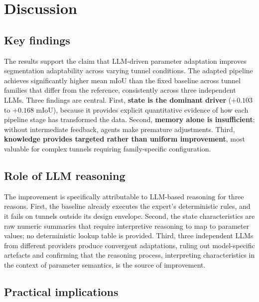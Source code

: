 \documentclass[a4paper,fleqn]{cas-dc}
\begin{document}
\section{Discussion}\label{sec:discussion}

\subsection{Key findings}

The results support the claim that LLM-driven parameter adaptation improves segmentation adaptability across varying tunnel conditions. The adapted pipeline achieves significantly higher mean mIoU than the fixed baseline across tunnel families that differ from the reference, consistently across three independent LLMs. Three findings are central. First, \textbf{state is the dominant driver} ($+0.103$ to $+0.168$ mIoU), because it provides explicit quantitative evidence of how each pipeline stage has transformed the data. Second, \textbf{memory alone is insufficient}: without intermediate feedback, agents make premature adjustments. Third, \textbf{knowledge provides targeted rather than uniform improvement}, most valuable for complex tunnels requiring family-specific configuration.

\subsection{Role of LLM reasoning}

The improvement is specifically attributable to LLM-based reasoning for three reasons. First, the baseline already executes the expert's deterministic rules, and it fails on tunnels outside its design envelope. Second, the state characteristics are raw numeric summaries that require interpretive reasoning to map to parameter values; no deterministic lookup table is provided. Third, three independent LLMs from different providers produce convergent adaptations, ruling out model-specific artefacts and confirming that the reasoning process, interpreting characteristics in the context of parameter semantics, is the source of improvement.


\subsection{Practical implications}
\end{document}
